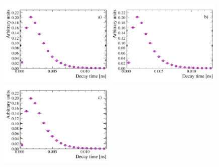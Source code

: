 \begin{figure}[tbp]
  \centering
    \includegraphics[width=0.49\textwidth]{./Figs/LifetimeMeasurement/2011_DT_Bs2MuMu.pdf}
    \includegraphics[width=0.49\textwidth]{./Figs/LifetimeMeasurement/2012_DT_Bs2MuMu.pdf}
    \includegraphics[width=0.49\textwidth]{./Figs/LifetimeMeasurement/2015_DT_Bs2MuMu.pdf}

\end{figure}
